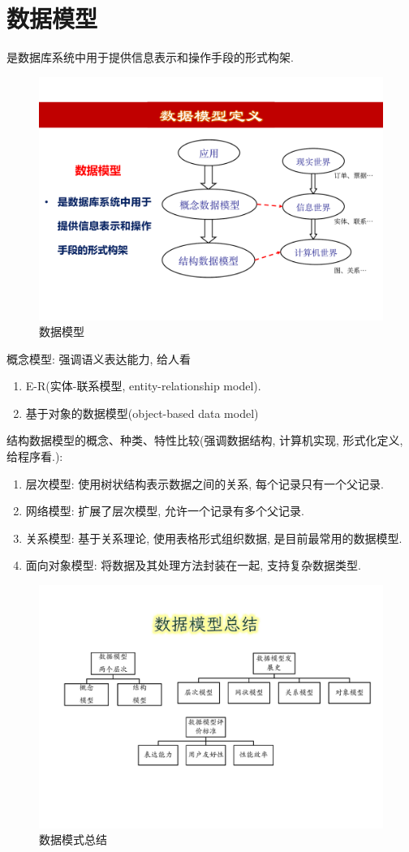 \section{数据模型}

\begin{definition}[数据模型]
    是数据库系统中用于提供信息表示和操作手段的形式构架.
\end{definition}

\begin{figure}[H]
    \centering
    \includegraphics[width=.35\textwidth]{figure/数据模型.pdf}
    \caption{数据模型}
\end{figure}

概念模型: 强调语义表达能力, 给人看
\begin{enumerate}
    \item E-R(实体-联系模型, entity-relationship model).
    \item 基于对象的数据模型(object-based data model)
\end{enumerate}

结构数据模型的概念、种类、特性比较(强调数据结构, 计算机实现, 形式化定义, 给程序看.):
\begin{enumerate}
    \item 层次模型: 使用树状结构表示数据之间的关系, 每个记录只有一个父记录.
    \item 网络模型: 扩展了层次模型, 允许一个记录有多个父记录.
    \item 关系模型: 基于关系理论, 使用表格形式组织数据, 是目前最常用的数据模型.
    \item 面向对象模型: 将数据及其处理方法封装在一起, 支持复杂数据类型.
\end{enumerate}

\begin{figure}[H]
    \centering
    \includegraphics[width=.7\textwidth]{figure/db-5.pdf}
    \caption{数据模式总结}
\end{figure}

